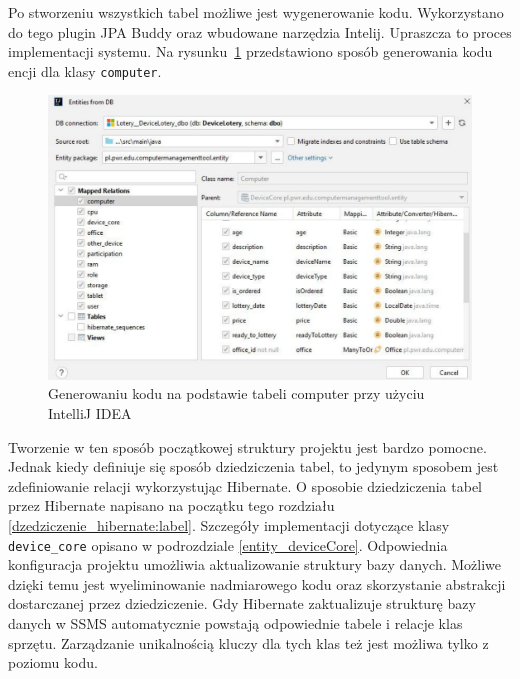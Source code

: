 Po stworzeniu wszystkich tabel możliwe jest wygenerowanie kodu. Wykorzystano do tego plugin JPA Buddy oraz wbudowane narzędzia Intelij. Upraszcza to proces implementacji systemu. Na rysunku~\ref{generate:label} przedstawiono sposób generowania kodu encji dla klasy \texttt{computer}.
\makeatletter
\setlength{\@fptop}{0pt}
\makeatother
\begin{figure}[t!]
		\centering
    \includegraphics[width=0.7\linewidth]{rys04/generate.pdf}
    \caption{Generowaniu kodu na podstawie tabeli computer przy użyciu IntelliJ IDEA}
    \label{generate:label}
\end{figure}

Tworzenie w ten sposób początkowej struktury projektu jest bardzo pomocne. Jednak kiedy definiuje się sposób dziedziczenia tabel, to jedynym sposobem jest zdefiniowanie relacji wykorzystując Hibernate. O sposobie dziedziczenia tabel przez Hibernate napisano na początku tego rozdziału \ref{dzedziczenie_hibernate:label}. Szczegóły implementacji dotyczące klasy \texttt{device\_core} opisano w podrozdziale \ref{entity_deviceCore}. Odpowiednia konfiguracja projektu umożliwia aktualizowanie struktury bazy danych. Możliwe dzięki temu jest wyeliminowanie nadmiarowego kodu oraz skorzystanie abstrakcji dostarczanej przez dziedziczenie. Gdy Hibernate zaktualizuje strukturę bazy danych w SSMS automatycznie powstają odpowiednie tabele i relacje klas sprzętu. Zarządzanie unikalnością kluczy dla tych klas też jest możliwa tylko z poziomu kodu.
 
